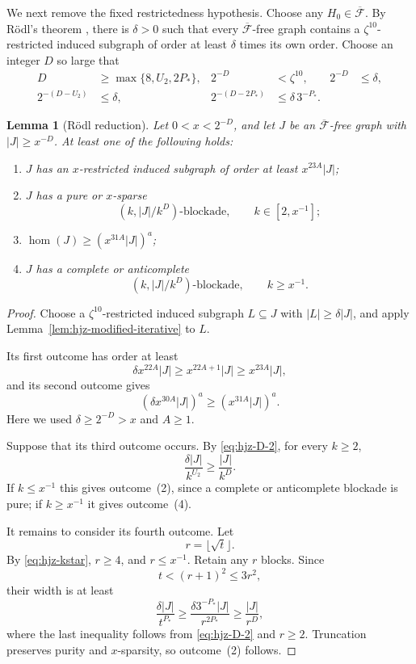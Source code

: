 \documentclass[11pt]{article}
\numberwithin{equation}{section}
\theoremstyle{plain}
\newtheorem{lemma}[theorem]{Lemma}
\theoremstyle{definition}
\begin{document}
We next remove the fixed restrictedness hypothesis.  Choose any
$H_0\in\overline{\mathcal F}$.  By R\"odl's theorem
\cite{Rodl1986}, there is $\delta>0$ such that every
$\overline{\mathcal F}$-free graph contains a
$\zeta^{10}$-restricted induced subgraph of order at least
$\delta$ times its own order.  Choose an integer $D$ so large that
\begin{align}
 D&\geq\max\{8,U_2,2P_*\},&
 2^{-D}&<\zeta^{10},&
 2^{-D}&\leq\delta,                                      \label{eq:hjz-D-1}\\
 2^{-(D-U_2)}&\leq\delta,&
 2^{-(D-2P_*)}&\leq\delta\,3^{-P_*}.                     \label{eq:hjz-D-2}
\end{align}

\begin{lemma}[R\"odl reduction]
\label{lem:hjz-modified-rodl}
Let $0<x<2^{-D}$, and let $J$ be an
$\overline{\mathcal F}$-free graph with $|J|\geq x^{-D}$.  At least
one of the following holds:
\begin{enumerate}
\item $J$ has an $x$-restricted induced subgraph of order at least
      $x^{23A}|J|$;
\item $J$ has a pure or $x$-sparse
\[
                   (k,|J|/k^D)\text{-blockade},
                   \qquad k\in[2,x^{-1}];
\]
\item $\operatorname{hom}(J)\geq(x^{31A}|J|)^a$;
\item $J$ has a complete or anticomplete
\[
                   (k,|J|/k^D)\text{-blockade},
                   \qquad k\geq x^{-1}.
\]
\end{enumerate}
\end{lemma}

\begin{proof}
Choose a $\zeta^{10}$-restricted induced subgraph
$L\subseteq J$ with $|L|\geq\delta|J|$, and apply
Lemma~\ref{lem:hjz-modified-iterative} to $L$.

Its first outcome has order at least
\[
 \delta x^{22A}|J|
      \geq x^{22A+1}|J|
      \geq x^{23A}|J|,
\]
and its second outcome gives
\[
 (\delta x^{30A}|J|)^a
      \geq(x^{31A}|J|)^a.
\]
Here we used $\delta\geq2^{-D}>x$ and $A\geq1$.

Suppose that its third outcome occurs.  By
\eqref{eq:hjz-D-2}, for every $k\geq2$,
\[
 \frac{\delta|J|}{k^{U_2}}\geq\frac{|J|}{k^D}.
\]
If $k\leq x^{-1}$ this gives outcome~(2), since a complete or
anticomplete blockade is pure; if $k\geq x^{-1}$ it gives
outcome~(4).

It remains to consider its fourth outcome.  Let
\[
                              r=\lfloor\sqrt t\rfloor.
\]
By \eqref{eq:hjz-kstar}, $r\geq4$, and $r\leq x^{-1}$.  Retain any
$r$ blocks.  Since
\[
                         t<(r+1)^2\leq3r^2,
\]
their width is at least
\[
 \frac{\delta|J|}{t^{P_*}}
       \geq\frac{\delta3^{-P_*}|J|}{r^{2P_*}}
       \geq\frac{|J|}{r^D},
\]
where the last inequality follows from
\eqref{eq:hjz-D-2} and $r\geq2$.  Truncation preserves purity and
$x$-sparsity, so outcome~(2) follows.
\end{proof}
\end{document}
